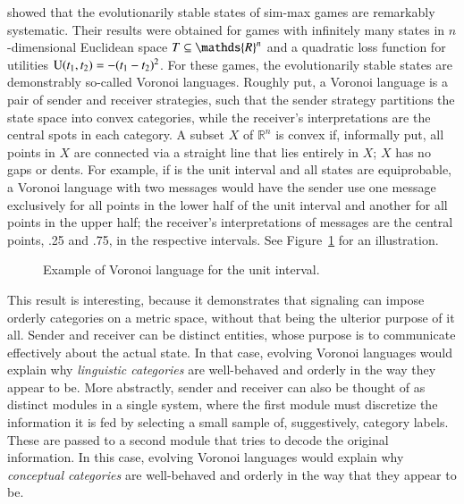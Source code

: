 \documentclass[fleqn,reqno,10pt]{article}
\begin{document}
\citet{JagerMetzger2011:Voronoi-Languag} showed that the
evolutionarily stable states of sim-max games are remarkably
systematic. Their results were obtained for games with infinitely many
states in $n$-dimensional Euclidean space $\States \subseteq
\mathds{R}^n$ and a quadratic loss function for utilities
$\mathrm{U}(t_{\mathrm{1}}, t_{\mathrm{2}}) = - (t_{\mathrm{1}} -
t_{\mathrm{2}})^2$. For these games, the evolutionarily stable states are
demonstrably so-called Voronoi languages. Roughly put, a Voronoi
language is a pair of sender and receiver strategies, such that the
sender strategy partitions the state space into convex categories,
while the receiver's interpretations are the central spots in each
category. A subset $X$ of $\mathds{R}^n$ is convex if, informally put,
all points in $X$ are connected via a straight line that lies entirely
in $X$; $X$ has no gaps or dents. For example, if \States is the unit
interval and all states are equiprobable, a Voronoi language with two
messages would have the sender use one message exclusively for all
points in the lower half of the unit interval and another for all
points in the upper half; the receiver's interpretations of messages
are the central points, .25 and .75, in the respective intervals.
See Figure~\ref{fig:Voronoi-language-example} for an illustration.

\begin{figure}
  \centering
  \caption{Example of Voronoi language for the unit interval.}
  \label{fig:Voronoi-language-example}
\end{figure}

This result is interesting, because it demonstrates that signaling can
impose orderly categories on a metric space, without that being the
ulterior purpose of it all. Sender and receiver can be distinct
entities, whose purpose is to communicate effectively about the actual
state. In that case, evolving Voronoi languages would explain why
\emph{linguistic categories} are well-behaved and orderly in the way
they appear to be. More abstractly, sender and receiver can also be
thought of as distinct modules in a single system, where the first
module must discretize the information it is fed by selecting a small
sample of, suggestively, category labels. These are passed to a second
module that tries to decode the original information. In this case,
evolving Voronoi languages would explain why \emph{conceptual
  categories} are well-behaved and orderly in the way that they appear
to be.
\end{document}
